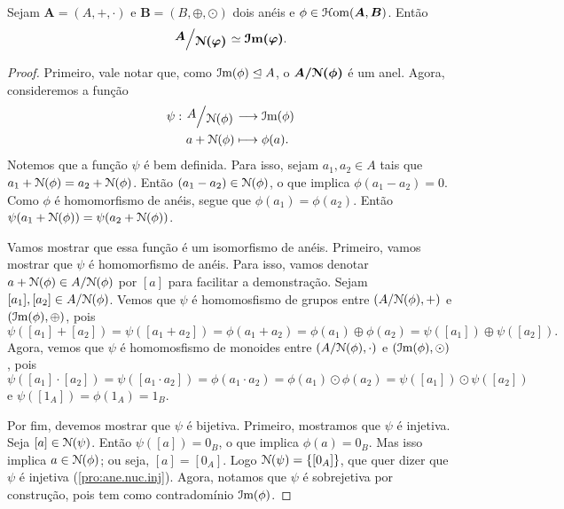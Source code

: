 \begin{teo}
\label{teo:iso1}
	Sejam $\bm A=(A,+,\cdot)$ e $\bm B=(B,\oplus,\odot)$ dois anéis e $\phi \in \mathcal{H}\mathrm{om}(\bm A,\bm B)$. Então
	\begin{equation*}
	\bm{\quo{A}{\nuc(\varphi)}} \simeq \bm{\im(\varphi)}.
	\end{equation*}
\end{teo}
\begin{proof}
	Primeiro, vale notar que, como $\mathcal{I}\mathrm{m}(\phi) \mathrel{\unlhd} A$, o $\bm{A/\mathcal{N}(\phi)}$ é um anel. Agora, consideremos a função
	\begin{align*}
	\func{\psi}{\quo{A}{\nuc(\phi)}}{\im(\phi)}{a+\nuc(\phi)}{\phi(a).}
	\end{align*}
Notemos que a função $\psi$ é bem definida. Para isso, sejam $a_1,a_2 \in A$ tais que $a_1+\mathcal{N}(\phi)=a_2+\mathcal{N}(\phi)$. Então $(a_1-a_2) \in \mathcal{N}(\phi)$, o que implica $\phi(a_1-a_2)=0$. Como $\phi$ é homomorfismo de anéis, segue que $\phi(a_1)=\phi(a_2)$. Então $\psi(a_1+\mathcal{N}(\phi)) = \psi(a_2+\mathcal{N}(\phi))$.

	Vamos mostrar que essa função é um isomorfismo de anéis. Primeiro, vamos mostrar que $\psi$ é homomorfismo de anéis. Para isso, vamos denotar $a+\mathcal{N}(\phi) \in A/\mathcal{N}(\phi)$ por $[a]$ para facilitar a demonstração. Sejam $[a_1],[a_2] \in A/\mathcal{N}(\phi)$. Vemos que $\psi$ é homomosfismo de grupos entre $(A/\mathcal{N}(\phi),+)$ e $(\mathcal{I}\mathrm{m}(\phi),\oplus)$, pois
	\begin{equation*}
	\psi([a_1]+[a_2]) = \psi([a_1+a_2]) = \phi(a_1+a_2) = \phi(a_1) \oplus \phi(a_2) = \psi([a_1]) \oplus \psi([a_2]).
	\end{equation*}
Agora, vemos que $\psi$ é homomosfismo de monoides entre $(A/\mathcal{N}(\phi),\cdot)$ e $(\mathcal{I}\mathrm{m}(\phi),\odot)$, pois
	\begin{equation*}
	\psi([a_1] \cdot [a_2]) = \psi([a_1 \cdot a_2]) = \phi(a_1 \cdot a_2) = \phi(a_1) \odot \phi(a_2) = \psi([a_1]) \odot \psi([a_2])
	\end{equation*}
e $\psi([1_A]) = \phi(1_A) = 1_B$.

	Por fim, devemos mostrar que $\psi$ é bijetiva. Primeiro, mostramos que $\psi$ é injetiva. Seja $[a] \in \mathcal{N}(\psi)$. Então $\psi([a])=0_B$, o que implica $\phi(a)=0_B$. Mas isso implica $a \in \mathcal{N}(\phi)$; ou seja, $[a]=[0_A]$. Logo $\mathcal{N}(\psi)=\{[0_A]\}$, que quer dizer que $\psi$ é injetiva (\ref{pro:ane.nuc.inj}). Agora, notamos que $\psi$ é sobrejetiva por construção, pois tem como contradomínio $\mathcal{I}\mathrm{m}(\phi)$.
\end{proof}

